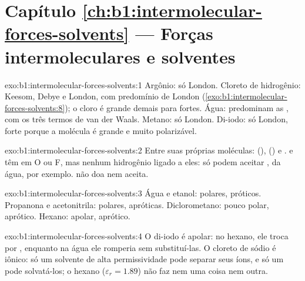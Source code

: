 \section*{Capítulo \ref{ch:b1:intermolecular-forces-solvents} --- Forças intermoleculares e solventes}

\begin{solution}{exo:b1:intermolecular-forces-solvents:1}
Argônio: só London. Cloreto de hidrogênio: Keesom, Debye e London, com
predomínio de London (\cref{exo:b1:intermolecular-forces-solvents:8}); o
cloro é grande demais para  fortes. Água:
predominam as , com os três termos de van der
Waals. Metano: só London. Di-iodo: só London, forte porque a molécula é
grande e muito polarizável.
\end{solution}

\begin{solution}{exo:b1:intermolecular-forces-solvents:2}
Entre suas próprias moléculas:  (), 
() e .  e  têm  em
O ou F, mas nenhum hidrogênio ligado a eles: só podem aceitar , da água, por exemplo.  não doa nem aceita.
\end{solution}

\begin{solution}{exo:b1:intermolecular-forces-solvents:3}
Água e etanol: polares, próticos. Propanona e acetonitrila: polares,
apróticas. Diclorometano: pouco polar, aprótico. Hexano: apolar, aprótico.
\end{solution}

\begin{solution}{exo:b1:intermolecular-forces-solvents:4}
O di-iodo é apolar: no hexano, ele troca  por
, enquanto na água ele romperia  sem substituí-las. O cloreto de sódio é iônico: só um
solvente de alta permissividade pode separar seus íons, e só um  pode solvatá-los; o hexano ($\varepsilon_r = 1.89$) não faz nem uma
coisa nem outra.
\end{solution}

